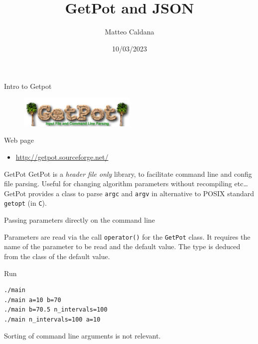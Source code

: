 \documentclass[10pt,aspectratio=169]{beamer}
\begin{document}
    \title{GetPot and JSON}
    \author{Matteo Caldana}
    \date{10/03/2023}

\begin{frame}
    \maketitle
\end{frame}

\begin{frame}{Intro to Getpot}
    \begin{figure}
        \centering
        \includegraphics[width=0.5\textwidth]{images/GetPot_logo.jpg}
    \end{figure}

    \begin{block}{Web page}
        \centering
        \begin{itemize}
            \item \url{http://getpot.sourceforge.net/}
        \end{itemize}
    \end{block}
\end{frame}

\begin{frame}{GetPot}
    GetPot is a \emph{header file only} library,
    to facilitate command line and config file parsing.
    Useful for changing algorithm parameters without recompiling
     etc\ldots\\[1cm]

    GetPot provides a class to parse \texttt{argc} and \texttt{argv}
    in alternative to POSIX standard \texttt{getopt} (in \texttt{C}).
\end{frame}

\begin{frame}[fragile]{Passing parameters directly on the command line}

    

    Parameters are read via the call \texttt{operator()} for the \texttt{GetPot} class.
    It requires the name of the parameter to be read and the default value.
    The type is deduced from the class of the default value.
\end{frame}

\begin{frame}[fragile]{Run}
    \begin{verbatim}
./main
./main a=10 b=70
./main b=70.5 n_intervals=100
./main n_intervals=100 a=10
    \end{verbatim}

    \vspace{1cm}
    
   	Sorting of command line arguments is not relevant.
\end{frame}
\end{document}
